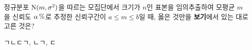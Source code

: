 정규분포 $\mathrm{N}(m{,}\mkern3mu\mathopen{}\sigma^2)$을 따르는 모집단에서 크기가 $n$인 표본을 임의추출하여 모평균 $m$을 신뢰도 $\alpha\mkern3mu \%$로 추정한 신뢰구간이 $a\le m\le b$일 때, 옳은 것만을 \textbf{보기}에서 있는 대로 고른 것은? 
\begin{choices32}{ㄱ}{ㄴ}{ㄷ}{ㄱ, ㄴ}{ㄱ, ㄷ}\end{choices32}

